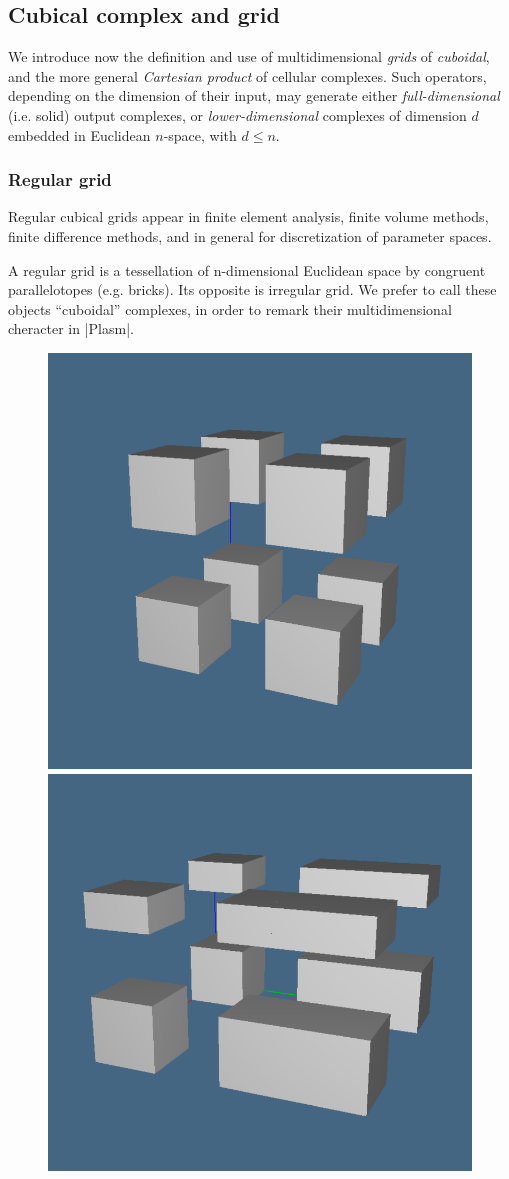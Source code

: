 \subsection{Cubical complex and grid}\label{sect:3-2-2}


We introduce now the definition and use of multidimensional \emph{grids} of \emph{cuboidal}, and the more general \emph{Cartesian product} of cellular complexes. Such operators, depending on the dimension of their input, may generate either \emph{full-dimensional} (i.e. solid) output complexes, or \emph{lower-dimensional} complexes of dimension $d$ embedded in Euclidean $n$-space, with $d\leq n$.  

\subsubsection*{Regular grid}


Regular cubical grids appear in finite element analysis, finite volume methods, finite difference methods, and in general for discretization of parameter spaces. 

\begin{definition} A regular grid is a tessellation of n-dimensional Euclidean space by congruent parallelotopes (e.g. bricks). Its opposite is irregular grid. We prefer to call these objects “cuboidal” complexes, in order to remark their multidimensional cheracter in |Plasm|.
\end{definition}


\begin{figure}[] %
   \includegraphics[height=0.5\linewidth,width=0.49\linewidth]{chapter-03/figs/cubic01}%
   \includegraphics[height=0.5\linewidth,width=0.49\linewidth]{chapter-03/figs/cubic02}%
   \caption{}
   \label{fig:3:cubics}
\end{figure}


